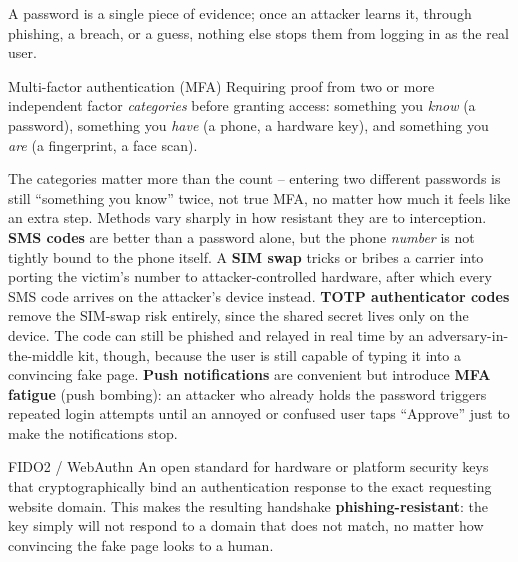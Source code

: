 A password is a single piece of evidence; once an attacker learns it, through phishing, a breach,
or a guess, nothing else stops them from logging in as the real user.

\begin{definition}{Multi-factor authentication (MFA)}
Requiring proof from two or more independent factor \emph{categories} before granting access:
something you \emph{know} (a password), something you \emph{have} (a phone, a hardware key), and
something you \emph{are} (a fingerprint, a face scan).
\end{definition}

The categories matter more than the count -- entering two different passwords is still ``something
you know'' twice, not true MFA, no matter how much it feels like an extra step. Methods vary sharply
in how resistant they are to interception. \textbf{SMS codes} are better than a password alone, but
the phone \emph{number} is not tightly bound to the phone itself. A \textbf{SIM swap} tricks or
bribes a carrier into porting the victim's number to attacker-controlled hardware, after which every
SMS code arrives on the attacker's device instead. \textbf{TOTP authenticator codes} remove the
SIM-swap risk entirely, since the shared secret lives only on the device. The code can still be
phished and relayed in real time by an adversary-in-the-middle kit, though, because the user is
still capable of typing it into a convincing fake page. \textbf{Push notifications} are convenient
but introduce \textbf{MFA fatigue} (push bombing): an attacker who already holds the password
triggers repeated login attempts until an annoyed or confused user taps ``Approve'' just to make
the notifications stop.

\begin{definition}{FIDO2 / WebAuthn}
An open standard for hardware or platform security keys that cryptographically bind an
authentication response to the exact requesting website domain. This makes the resulting handshake
\textbf{phishing-resistant}: the key simply will not respond to a domain that does not match, no
matter how convincing the fake page looks to a human.
\end{definition}

